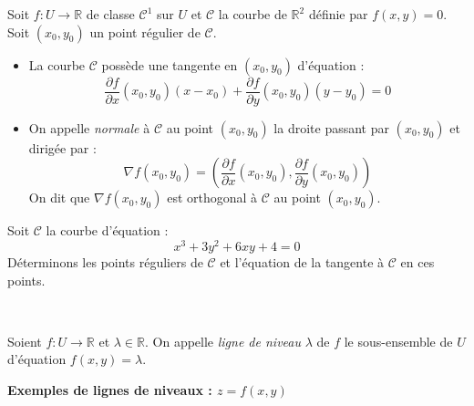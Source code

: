 \documentclass[french,11pt,twoside]{VcCours}
\begin{document}
\medskip

\begin{TheoremeDefinition}{} Soit $f : U \rightarrow \mathbb{R}$ de classe $\mathcal{C}^1$ sur $U$ et $\mathcal{C}$ la courbe de $\mathbb{R}^2$ définie par $f(x,y)=0$. Soit $(x_0,y_0)$ un point régulier de $\mathcal{C}$.
\begin{itemize}
\item La courbe $\mathcal{C}$ possède une tangente en $(x_0,y_0)$ d'équation :
$$ \dfrac{\partial f}{\partial  x}(x_0,y_0)(x-x_0) + \dfrac{\partial f}{\partial y}(x_0,y_0) (y-y_0)=0$$
\item On appelle \emph{normale} à $\mathcal{C}$ au point $(x_0,y_0)$ la droite passant par $(x_0,y_0)$ et dirigée par :
$$ \nabla f(x_0,y_0) = \left(\dfrac{\partial f}{\partial  x}(x_0,y_0), \dfrac{\partial f}{\partial  y}(x_0,y_0) \right)$$
On dit que $ \nabla f(x_0,y_0)$ est orthogonal à $\mathcal{C}$ au point $(x_0,y_0)$.
\end{itemize}
\end{TheoremeDefinition}{}

%
%
%
%
%

\begin{Exemple}{} Soit $\mathcal{C}$ la courbe d'équation :
$$ x^3+3y^2+6xy+4=0$$
Déterminons les points réguliers de $\mathcal{C}$ et l'équation de la tangente à $\mathcal{C}$ en ces points.

\newpage

$\phantom{}$
\vspace{10cm}
\end{Exemple}

\begin{Definition}{} Soient $f : U \rightarrow \mathbb{R}$ et $\lambda \in \mathbb{R}$. On appelle \emph{ligne de niveau} $\lambda$ de $f$ le sous-ensemble de $U$ d'équation $f(x,y)=\lambda$.
\end{Definition}

\begin{center}
\textbf{Exemples de lignes de niveaux : $z=f(x,y)$}
\end{center}
\end{document}
